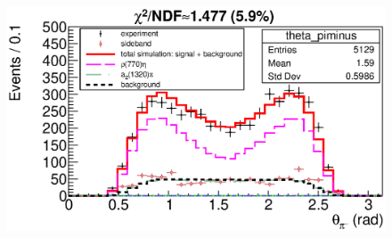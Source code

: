 \documentclass{beamer}
\begin{document}
\begin{frame}
\begin{minipage}[t]{0.48\linewidth}
\begin{figure}
    \end{figure}
  \end{minipage}
  \begin{minipage}[t]{0.48\linewidth}
    \begin{figure}
      \includegraphics[width=\linewidth]{figures/theta_piminus_g950.eps}
    \end{figure}
  \end{minipage}
\end{frame}
\end{document}
